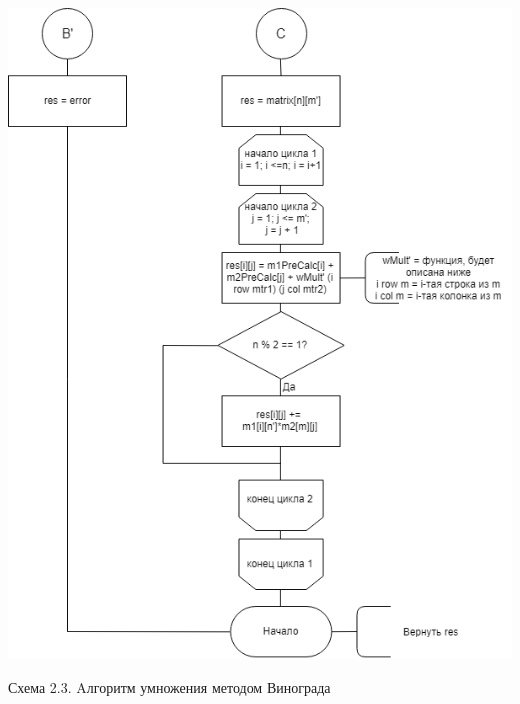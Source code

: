 \documentclass[12pt]{report}
\begin{document}
\begin{center}
    \includegraphics[scale=0.7]{WinogradMult3}

    Схема 2.3. Aлгоритм умножения методом Винограда


\end{center}
\end{document}
